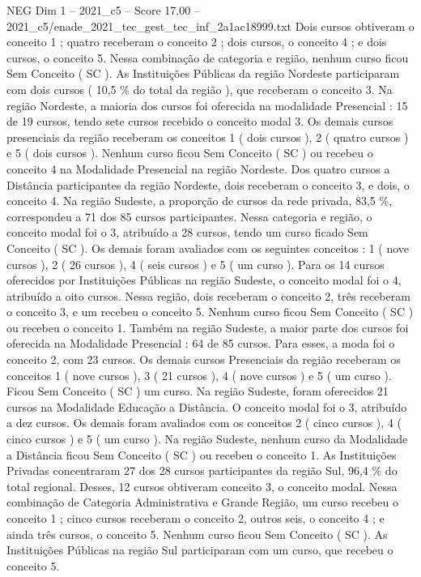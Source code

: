 \begin{textsample}{NEG Dim 1 – 2021\_c5 – Score 17.00 – 2021\_c5/enade\_2021\_tec\_gest\_tec\_inf\_2a1ac18999.txt}
Dois cursos obtiveram o conceito 1 ; quatro receberam o conceito 2 ; dois cursos, o conceito 4 ; e dois cursos, o conceito 5.
Nessa combinação de categoria e região, nenhum curso ficou Sem Conceito ( SC ).
As Instituições Públicas da região Nordeste participaram com dois cursos ( 10,5 \% do total da região ), que receberam o conceito 3.
Na região Nordeste, a maioria dos cursos foi oferecida na modalidade Presencial : 15 de 19 cursos, tendo sete cursos recebido o conceito modal 3.
Os demais cursos presenciais da região receberam os conceitos 1 ( dois cursos ), 2 ( quatro cursos ) e 5 ( dois cursos ).
Nenhum curso ficou Sem Conceito ( SC ) ou recebeu o conceito 4 na Modalidade Presencial na região Nordeste.
Dos quatro cursos a Distância participantes da região Nordeste, dois receberam o conceito 3, e dois, o conceito 4.
Na região Sudeste, a proporção de cursos da rede privada, 83,5 \%, correspondeu a 71 dos 85 cursos participantes.
Nessa categoria e região, o conceito modal foi o 3, atribuído a 28 cursos, tendo um curso ficado Sem Conceito ( SC ).
Os demais foram avaliados com os seguintes conceitos : 1 ( nove cursos ), 2 ( 26 cursos ), 4 ( seis cursos ) e 5 ( um curso ).
Para os 14 cursos oferecidos por Instituições Públicas na região Sudeste, o conceito modal foi o 4, atribuído a oito cursos.
Nessa região, dois receberam o conceito 2, três receberam o conceito 3, e um recebeu o conceito 5.
Nenhum curso ficou Sem Conceito ( SC ) ou recebeu o conceito 1.
Também na região Sudeste, a maior parte dos cursos foi oferecida na Modalidade Presencial : 64 de 85 cursos.
Para esses, a moda foi o conceito 2, com 23 cursos.
Os demais cursos Presenciais da região receberam os conceitos 1 ( nove cursos ), 3 ( 21 cursos ), 4 ( nove cursos ) e 5 ( um curso ).
Ficou Sem Conceito ( SC ) um curso.
Na região Sudeste, foram oferecidos 21 cursos na Modalidade Educação a Distância.
O conceito modal foi o 3, atribuído a dez cursos.
Os demais foram avaliados com os conceitos 2 ( cinco cursos ), 4 ( cinco cursos ) e 5 ( um curso ).
Na região Sudeste, nenhum curso da Modalidade a Distância ficou Sem Conceito ( SC ) ou recebeu o conceito 1.
As Instituições Privadas concentraram 27 dos 28 cursos participantes da região Sul, 96,4 \% do total regional.
Desses, 12 cursos obtiveram conceito 3, o conceito modal.
Nessa combinação de Categoria Administrativa e Grande Região, um curso recebeu o conceito 1 ; cinco cursos receberam o conceito 2, outros seis, o conceito 4 ; e ainda três cursos, o conceito 5.
Nenhum curso ficou Sem Conceito ( SC ).
As Instituições Públicas na região Sul participaram com um curso, que recebeu o conceito 5.

\end{textsample}
